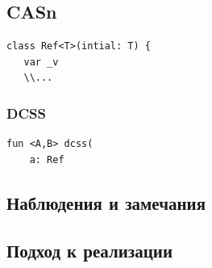 \documentclass[10pt,a4paper,oneside,titlepage]{article}
\begin{document}
\subsection{CASn}

\begin{lstlisting}
class Ref<T>(intial: T) {
   var _v
   \\...
\end{lstlisting}

\subsubsection{DCSS}

\begin{lstlisting}
fun <A,B> dcss(
    a: Ref
\end{lstlisting}

\subsection{Наблюдения и замечания}

\subsection{Подход к реализации}
\end{document}
